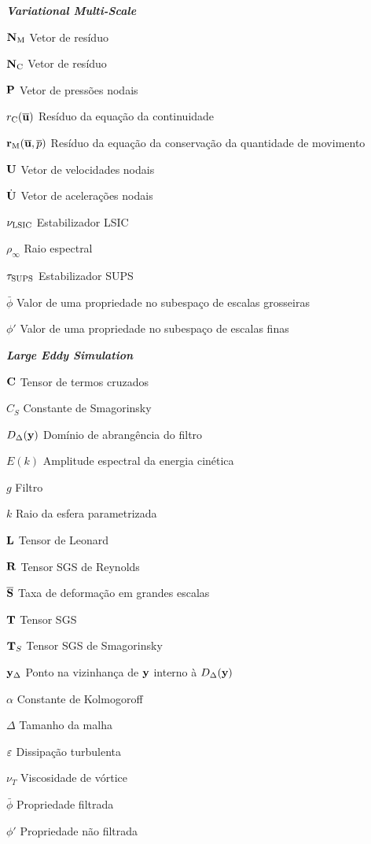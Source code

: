 \begin{simbolos}
    \item[\textbf{\textit{Variational Multi-Scale}}]
    \item[$\mathbf{N}_\mathrm{M}$] Vetor de resíduo
    \item[$\mathbf{N}_\mathrm{C}$] Vetor de resíduo
    \item[$\mathbf{P}$] Vetor de pressões nodais
    \item[$r_\mathrm{C}(\overline{\mathbf{u}})$] Resíduo da equação da continuidade
    \item[$\mathbf{r}_\mathrm{M}(\overline{\mathbf{u}},\overline{p})$] Resíduo da equação da conservação da quantidade de movimento
    \item[$\mathbf{U}$] Vetor de velocidades nodais
    \item[$\dot{\mathbf{U}}$] Vetor de acelerações nodais
    \item[$\nu_{\mathrm{LSIC}}$] Estabilizador LSIC
    \item[$\rho_\infty$] Raio espectral
    \item[$\tau_{\mathrm{SUPS}}$] Estabilizador SUPS
    \item[$\bar{\phi}$] Valor de uma propriedade no subespaço de escalas grosseiras
    \item[$\phi'$] Valor de uma propriedade no subespaço de escalas finas

    \item[\textbf{\textit{Large Eddy Simulation}}]
    \item[$\mathbf{C}$] Tensor de termos cruzados
    \item[$C_S$] Constante de Smagorinsky
    \item[$D_\Delta(\mathbf{y})$] Domínio de abrangência do filtro
    \item[$E(k)$] Amplitude espectral da energia cinética
    \item[$g$] Filtro
    \item[$k$] Raio da esfera parametrizada
    \item[$\mathbf{L}$] Tensor de Leonard
    \item[$\mathbf{R}$] Tensor SGS de Reynolds
    \item[$\overline{\mathbf{S}}$] Taxa de deformação em grandes escalas
    \item[$\mathbf{T}$] Tensor SGS
    \item[$\mathbf{T}_S$] Tensor SGS de Smagorinsky
    \item[$\mathbf{y}_\Delta$] Ponto na vizinhança de $\mathbf{y}$ interno à $D_\Delta(\mathbf{y})$
    \item[$\alpha$] Constante de Kolmogoroff
    \item[$\Delta$] Tamanho da malha
    \item[$\varepsilon$] Dissipação turbulenta
    \item[$\nu_T$] Viscosidade de vórtice
    \item[$\bar{\phi}$] Propriedade filtrada
    \item[$\phi'$] Propriedade não filtrada


\end{simbolos}
